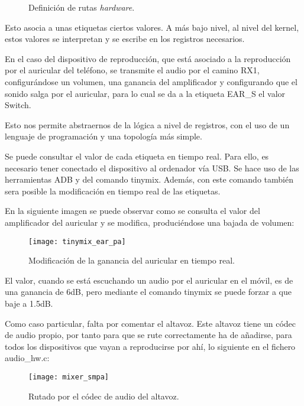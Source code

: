 \begin{figure}[H]
	\centering
	\caption{Definición de rutas \textit{hardware}.} \label{fig:definicion_rutas_mixer}
\end{figure}

Esto asocia a unas etiquetas ciertos valores. A más bajo nivel, al nivel del kernel, estos valores se interpretan y se escribe en los registros necesarios.

En el caso del dispositivo de reproducción, que está asociado a la reproducción por el auricular del teléfono, se transmite el audio por el camino RX1, configurándose un volumen, una ganancia del amplificador y configurando que el sonido salga por el auricular, para lo cual se da a la etiqueta EAR\_S el valor Switch.

Esto nos permite abstraernos de la lógica a nivel de registros, con el uso de un lenguaje de programación y una topología más simple.

Se puede consultar el valor de cada etiqueta en tiempo real. Para ello, es necesario tener conectado el dispositivo al ordenador vía \gls{USB}. Se hace uso de las herramientas \gls{ADB} y del comando tinymix. Además, con este comando también sera posible la modificación en tiempo real de las etiquetas.

En la siguiente imagen se puede observar como se consulta el valor del amplificador del auricular y se modifica, produciéndose una bajada de volumen:

\begin{figure}[H]
	\centering
	\texttt{[image: tinymix\_ear\_pa]}
	\caption{Modificación de la ganancia del auricular en tiempo real.} 
	\label{fig:tinymix_ear_pa}
\end{figure}

El valor, cuando se está escuchando un audio por el auricular en el móvil, es de una ganancia de 6\gls{dB}, pero mediante el comando tinymix se puede forzar a que baje a 1.5\gls{dB}.

Como caso particular, falta por comentar el altavoz. Este altavoz tiene un códec de audio propio, por tanto para que se rute correctamente ha de añadirse, para todos los dispositivos que vayan a reproducirse por ahí, lo siguiente en el fichero audio\_hw.c:

\begin{figure}[H]
	\centering
	\texttt{[image: mixer\_smpa]}
	\caption{Rutado por el códec de audio del altavoz.} 
	\label{fig:mixer_smpa}
\end{figure}

